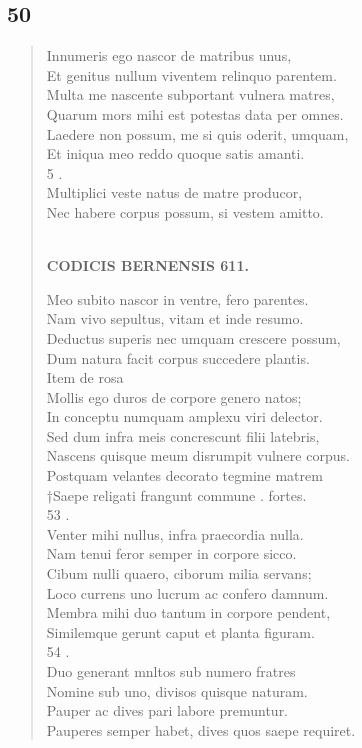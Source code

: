 \documentclass[11pt, a4paper]{report}
\begin{document}
            \subsection*{50}
      \begin{verse}
      Innumeris ego nascor de matribus unus, \\ Et genitus nullum viventem relinquo parentem. \\ Multa me nascente subportant vulnera matres, \\ Quarum mors mihi est potestas data per omnes. \\ Laedere non possum, me si quis oderit, umquam, \\ Et iniqua meo reddo quoque satis amanti. \\ 5 . \\ Multiplici veste natus de matre producor, \\ Nec habere corpus possum, si vestem amitto. \\ 
        ﻿\pagebreak 
    \begin{center} \textbf{CODICIS BERNENSIS 611.} \end{center} \marginpar{[367]} Meo subito nascor in ventre, fero parentes. \\ Nam vivo sepultus, vitam et inde resumo. \\ Deductus superis nec umquam crescere possum, \\ Dum natura facit corpus succedere plantis. \\ Item de rosa \\ Mollis ego duros de corpore genero natos; \\ In conceptu numquam amplexu viri delector. \\ Sed dum infra meis concrescunt filii latebris, \\ Nascens quisque meum disrumpit vulnere corpus. \\ Postquam velantes decorato tegmine matrem \\ †Saepe religati frangunt commune . fortes. \\ 53 . \\ Venter mihi nullus, infra praecordia nulla. \\ Nam tenui feror semper in corpore sicco. \\ Cibum nulli quaero, ciborum milia servans; \\ Loco currens uno lucrum ac confero damnum. \\ Membra mihi duo tantum in corpore pendent, \\ Similemque gerunt caput et planta figuram. \\ 54 . \\ Duo generant mnltos sub numero fratres \\ Nomine sub uno, divisos quisque naturam. \\ Pauper ac dives pari labore premuntur. \\ Pauperes semper habet, dives quos saepe requiret. \\ 

\end{verse}
\end{document}
